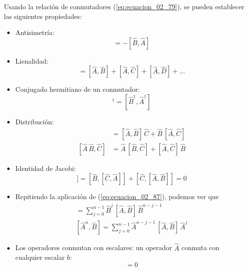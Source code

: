 Usando la relación de conmutadores (\ref{eq:ecuacion_02_79}), se pueden establecer las siguientes propiedades:
\begin{itemize}
\item Antisimetría:
\begin{equation}
[\hat{A}, \hat{B}] = - [\hat{B}, \hat{A}]
\label{eq:ecuacion_02_84}
\end{equation}
\item Lienalidad:
\begin{equation}
[\hat{A} + \hat{B} + \hat{C} + \hat{D} + \ldots] = [\hat{A} , \hat{B}] + [\hat{A} , \hat{C}] + [\hat{A} , \hat{D}] + \ldots
\label{eq:ecuacion_02_85} 
\end{equation}
\item Conjugado hermitiano de un conmutador:
\begin{equation}
[\hat{A}, \hat{B}]^{\dagger} = [\hat{B}^{\dagger}, \hat{A}^{\dagger}]
\label{eq:ecuacion_02_86}
\end{equation}
\item Distribución:
\begin{align}
[\hat{A},  \hat{B} \, \hat{C}] &= [\hat{A} , \hat{B}] \,  \hat{C} + \hat{B} \, [\hat{A} , \hat{C}]
\label{eq:ecuacion_02_87} \\[1em]
[\hat{A} \, \hat{B} , \hat{C}] &= \hat{A} \,[ \hat{B} ,  \hat{C}] + [\hat{A} , \hat{C}] \, \hat{B}
\label{eq:ecuacion_02_88}
\end{align}
\item Identidad de Jacobi:
\begin{equation}
[\hat{A},  [\hat{B} , \hat{C}]] = [\hat{B}, [\hat{C} , \hat{A}]] + [\hat{C},  [\hat{A} , \hat{B}]] = 0
\label{eq:ecuacion_02_89}
\end{equation}
\item Repitiendo la aplicación de (\ref{eq:ecuacion_02_87}), podemos ver que
\begin{align}
[\hat{A},  \hat{B}^{n}] = \sum_{j=0}^{n-1} \hat{B}^{j} \, [\hat{A},  \hat{B}] \, \hat{B}^{n-j-1} \label{eq:ecuacion_02_90} \\
[\hat{A}^{n},  \hat{B}] = \sum_{j=0}^{n-1} \hat{A}^{n-j-1} \, [\hat{A},  \hat{B}] \, \hat{A}^{j} \label{eq:ecuacion_02_91}
\end{align}
\item Los operadores conmutan con escalares: un operador $\hat{A}$ conmuta con cualquier escalar $b$:
\begin{equation}
[ \hat{A}, b ] = 0
\label{eq:ecuacion_02_92}
\end{equation}
\end{itemize}
